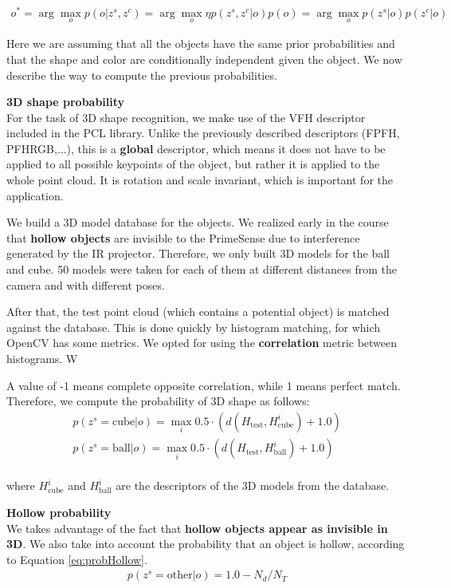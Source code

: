 \begin{align}
\label{eq:obj_map}
o^* = \arg\max_o p(o|z^s, z^c) = \arg\max_o \eta p(z^s, z^c|o) p(o) = \arg\max_o p(z^s|o)p(z^c|o)
\end{align}

Here we are assuming that all the objects have the same prior probabilities and that the shape and color are conditionally independent given the object. 
We now describe the way to compute the previous probabilities.

\textbf{3D shape probability}\\
For the task of 3D shape recognition, we make use of the VFH descriptor included in the PCL library. Unlike the previously described descriptors (FPFH, PFHRGB,...), this is a \textbf{global} descriptor, which means it does not have to be applied to all possible keypoints of the object, but rather it is applied to the whole point cloud. It is rotation and scale invariant, which is important for the application. 

We build a 3D model database for the objects. We realized early in the course that \textbf{hollow objects} are invisible to the PrimeSense due to interference generated by the IR projector. Therefore, we only built 3D models for the ball and cube. 50 models were taken for each of them at different distances from the camera and with different poses. 

After that, the test point cloud (which contains a potential object) is matched against the database. This is done quickly by histogram matching, for which OpenCV has some metrics. We opted for using the \textbf{correlation} metric between histograms. W

A value of -1 means complete opposite correlation, while 1 means perfect match. Therefore, we compute the probability of 3D shape as follows:
\begin{align}
p(z^s = \text{cube} | o) = \max_i 0.5\cdot(d(H_{\text{test}}, H_{\text{cube}}^i) + 1.0) \\
p(z^s = \text{ball} | o) = \max_i 0.5\cdot(d(H_{\text{test}}, H_{\text{ball}}^i) + 1.0) \\
\end{align}

where $H_{\text{cube}}^i$ and $H_{\text{ball}}^i$ are the descriptors of the 3D models from the database.

\textbf{Hollow probability}\\
We takes advantage of the fact that \textbf{hollow objects appear as invisible in 3D}. We also take into account the probability that an object is hollow, according to Equation \ref{eq:probHollow}.
\begin{align}
\label{eq:probHollow}
p(z^s = \text{other} | o) = 1.0 - N_d/N_T
\end{align}

